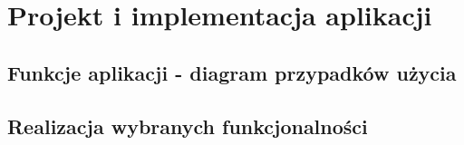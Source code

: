 \chapter{Projekt i implementacja aplikacji}

\section{Funkcje aplikacji - diagram przypadków użycia}

\section{Realizacja wybranych funkcjonalności}
